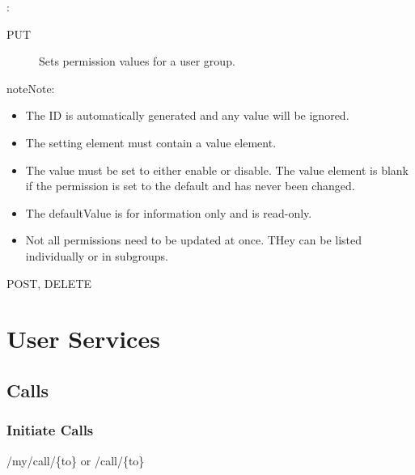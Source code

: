 \documentclass[letterpaper,10pt,english]{sphinxmanual}
\begin{document}
:

\begin{sphinxVerbatim}[commandchars=\\\{\}]
\end{sphinxVerbatim}
\begin{description}
\item[{ PUT}] \leavevmode
Sets permission values for a user group.

\end{description}

\begin{sphinxadmonition}{note}{Note:}\begin{itemize}
\item {} 
The ID is automatically generated and any value will be ignored.

\item {} 
The setting element must contain a value element.

\item {} 
The value must be set to either enable or disable. The value element is blank if the permission is set to the default and has never been changed.

\item {} 
The defaultValue is for information only and is read-only.

\item {} 
Not all permissions need to be updated at once. THey can be listed individually or in subgroups.

\end{itemize}
\end{sphinxadmonition}

 POST, DELETE


\section{User Services}
\label{\detokenize{restapi:user-services}}

\subsection{Calls}
\label{\detokenize{restapi:calls}}

\subsubsection{Initiate Calls}
\label{\detokenize{restapi:initiate-calls}}
 /my/call/\{to\} or /call/\{to\}
\end{document}
